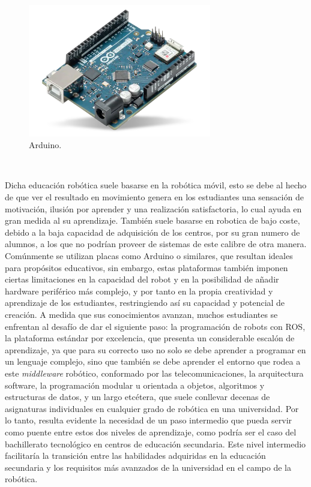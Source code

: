 
\begin{figure} [h!]
  \begin{center}
    \includegraphics[width=8cm]{figs/Arduino}
  \end{center}
  \caption{Arduino.}
  \label{fig:arduino}
\end{figure}\

Dicha educación robótica suele basarse en la robótica móvil, esto se debe al
hecho de que ver el resultado en movimiento genera en los estudiantes una
sensación de motivación, ilusión por aprender y una realización satisfactoria,
lo cual ayuda en gran medida al su aprendizaje.
También suele basarse en robotica de bajo coste, debido a la baja capacidad de
adquisición de los centros, por su gran numero de alumnos, a los que no podrían
proveer de sistemas de este calibre de otra manera.
Comúnmente se utilizan placas como Arduino o similares, que resultan ideales
para propósitos educativos, sin embargo, estas plataformas también imponen
ciertas limitaciones en la capacidad del robot y en la posibilidad de añadir
hardware periférico más complejo, y por tanto en la propia creatividad y
aprendizaje de los estudiantes, restringiendo así su capacidad y potencial de
creación.
A medida que sus conocimientos avanzan, muchos estudiantes se enfrentan al
desafío de dar el siguiente paso: la programación de robots con ROS, la
plataforma estándar por excelencia, que presenta un considerable escalón de
aprendizaje, ya que para su correcto uso no solo se debe aprender a programar
en un lenguaje complejo, sino que también se debe aprender el entorno que rodea
a este \textit{middleware} robótico, conformado por las telecomunicaciones, la
arquitectura software, la programación modular u orientada a objetos, algoritmos
y estructuras de datos, y un largo etcétera, que suele conllevar decenas de
asignaturas individuales en cualquier grado de robótica en una universidad.
Por lo tanto, resulta evidente la necesidad de un paso intermedio que pueda
servir como puente entre estos dos niveles de aprendizaje, como podría ser el
caso del bachillerato tecnológico en centros de educación secundaria.
Este nivel intermedio facilitaría la transición entre las habilidades adquiridas
en la educación secundaria y los requisitos más avanzados de la universidad en
el campo de la robótica.

